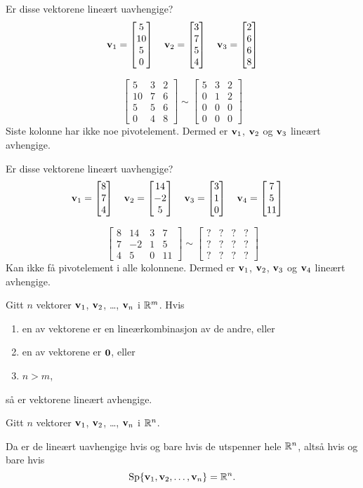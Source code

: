 \begin{ex}
Er disse vektorene lineært uavhengige?
\[
\mathbf{v}_1 = \begin{bmatrix} 5 \\ 10 \\ 5 \\ 0 \end{bmatrix}\quad
\mathbf{v}_2 = \begin{bmatrix} 3 \\ 7 \\ 5 \\ 4 \end{bmatrix}\quad
\mathbf{v}_3 = \begin{bmatrix} 2 \\ 6 \\ 6 \\ 8 \end{bmatrix}
\]

\[
\begin{bmatrix}
5 & 3 & 2 \\
10 & 7 & 6 \\
5 & 5 & 6 \\
0 & 4 & 8
\end{bmatrix}
\sim
\begin{bmatrix}
5 & 3 & 2 \\
0 & 1 & 2 \\
0 & 0 & 0 \\
0 & 0 & 0
\end{bmatrix}
\]
Siste kolonne har ikke noe pivotelement.  Dermed er $\mathbf{v}_1$,
$\mathbf{v}_2$ og $\mathbf{v}_3$ lineært avhengige.
\end{ex}


\begin{ex}
Er disse vektorene lineært uavhengige?
\[
\mathbf{v}_1 = \begin{bmatrix} 8 \\ 7 \\ 4 \end{bmatrix}\quad
\mathbf{v}_2 = \begin{bmatrix} 14 \\ -2 \\ 5 \end{bmatrix}\quad
\mathbf{v}_3 = \begin{bmatrix} 3 \\ 1 \\ 0 \end{bmatrix}\quad
\mathbf{v}_4 = \begin{bmatrix} 7 \\ 5 \\ 11 \end{bmatrix}\quad
\]

\[
\begin{bmatrix}
8 & 14 & 3 & 7 \\
7 & -2 & 1 & 5 \\
4 & 5 & 0 & 11
\end{bmatrix}
\sim
\begin{bmatrix}
? & ? & ? & ? \\
? & ? & ? & ? \\
? & ? & ? & ?
\end{bmatrix}
\]
Kan ikke få pivotelement i alle kolonnene.  Dermed er
$\mathbf{v}_1$, $\mathbf{v}_2$, $\mathbf{v}_3$ og $\mathbf{v}_4$ lineært avhengige.
\end{ex}




\begin{thm}
\label{thm:linavhspan}
Gitt $n$ vektorer  $\mathbf{v}_1$, $\mathbf{v}_2$, \ldots, $\mathbf{v}_n$ i $\mathbb{R}^m$.  Hvis
\begin{enumerate}
\item en av vektorene er en lineærkombinasjon av de andre, eller
\item en av vektorene er $\mathbf{0}$, eller
\item $n > m$,
\end{enumerate}
så er vektorene lineært avhengige.
\end{thm}



\begin{thm}
\label{thm:linuavhspan}
Gitt $n$ vektorer $\mathbf{v}_1$, $\mathbf{v}_2$, \ldots, $\mathbf{v}_n$ i $\mathbb{R}^n$.

Da er de lineært uavhengige hvis og bare hvis de utspenner hele $\mathbb{R}^n$,
altså hvis og bare hvis
\[
\operatorname{Sp} \{ \mathbf{v}_1, \mathbf{v}_2, \ldots, \mathbf{v}_n \} = \mathbb{R}^n.
\]
\end{thm}




\kapittelslutt

